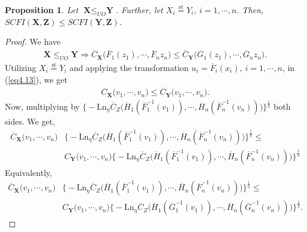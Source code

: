 \documentclass[12pt, a4paper]{article}
\numberwithin{equation}{section}
\newtheorem{proposition}{Proposition}[section]
\begin{document}
\begin{proposition}\label{prop4.6}
Let $\textbf{X}\le_{UO}\textbf{Y}$. Further, let $X_i\overset{\mathrm{st}}{=}Y_i,~i=1,\cdots,n$. Then, $SCFI(\textbf{X},\textbf{Z})\le SCFI(\textbf{Y},\textbf{Z})$.
\end{proposition}
\begin{proof}
We have 
\begin{align}\label{eq4.13}
\textbf{X}\le_{UO}\textbf{Y}\Rightarrow \overline C_\textbf{X}\big(\overline F_1(z_1),\cdots, \overline F_nz_n\big)\le \overline C_\textbf{Y}\big(\overline G_1(z_1),\cdots, \overline G_nz_n\big).
\end{align}
Utilizing $X_i\overset{\mathrm{st}}{=}Y_i$ and applying the transformation $u_i=\overline F_i(x_i),~i=1,\cdots,n$, in (\ref{eq4.13}), we get 
\begin{align*}
\overline C_\textbf{X}\big(v_1,\cdots, v_n\big)\le \overline C_\textbf{Y}\big(v_1,\cdots, v_n\big).
\end{align*} Now, multiplying by $\Big\{-\mathrm{Ln}_\eta\overline C_Z\big(\overline H_1(\overline F_1^{-1}(v_1)),\cdots,\overline H_n(\overline F_n^{-1}(v_n))\big)\Big\}^{\frac{1}{\eta}}$ both sides. We get,
\begin{align*}
\overline C_\textbf{X}\big(v_1,\cdots, v_n\big)	&\Big\{-\mathrm{Ln}_\eta\overline C_Z\big(\overline H_1(\overline F_1^{-1}(v_1)),\cdots,\overline H_n(\overline\nonumber F_n^{-1}(v_n))\big)\Big\}^{\frac{1}{\eta}}\leq\\& C_\textbf{Y}\big(v_1,\cdots, v_n\big)\Big\{-\mathrm{Ln}_\eta\overline C_Z\big(\overline H_1(\overline F_1^{-1}(v_1)),\cdots,\overline H_n(\overline F_n^{-1}(v_n))\big)\Big\}^{\frac{1}{\eta}}
\end{align*}
Equivalently,
\begin{align}\label{4.16}
	\overline C_\textbf{X}\big(v_1,\cdots, v_n\big)	&\Big\{-\mathrm{Ln}_\eta\overline C_Z\big(\overline H_1(\overline F_1^{-1}(v_1)),\cdots,\overline H_n(\overline\nonumber F_n^{-1}(v_n))\big)\Big\}^{\frac{1}{\eta}}\leq\\& C_\textbf{Y}\big(v_1,\cdots, v_n\big)\Big\{-\mathrm{Ln}_\eta\overline C_Z\big(\overline H_1(\overline G_1^{-1}(v_1)),\cdots,\overline H_n(\overline G_n^{-1}(v_n))\big)\Big\}^{\frac{1}{\eta}}.
\end{align}
\end{proof}
\end{document}
